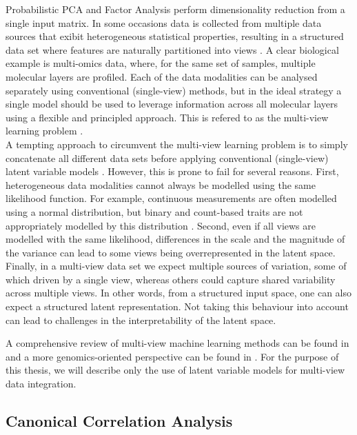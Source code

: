 Probabilistic PCA and Factor Analysis perform dimensionality reduction from a single input matrix. In some occasions data is collected from multiple data sources that exibit heterogeneous statistical properties, resulting in a structured data set where features are naturally partitioned into views \cite{Xu2013,Li2016,Zeng2018}. A clear biological example is multi-omics data, where, for the same set of samples, multiple molecular layers are profiled. Each of the data modalities can be analysed separately using conventional (single-view) methods, but in the ideal strategy a single model should be used to leverage information across all molecular layers using a flexible and principled approach. This is refered to as the multi-view learning problem \cite{Xu2013,Li2016}.\\
A tempting approach to circumvent the multi-view learning problem is to simply concatenate all different data sets before applying conventional (single-view) latent variable models \cite{Ritchie2015}. However, this is prone to fail for several reasons. First, heterogeneous data modalities cannot always be modelled using the same likelihood function. For example, continuous measurements are often modelled using a normal distribution, but binary and count-based traits are not appropriately modelled by this distribution \cite{Pilling2018}. Second, even if all views are modelled with the same likelihood, differences in the scale and the magnitude of the variance can lead to some views being overrepresented in the latent space. Finally, in a multi-view data set we expect multiple sources of variation, some of which driven by a single view, whereas others could capture shared variability across multiple views. In other words, from a structured input space, one can also expect a structured latent representation. Not taking this behaviour into account can lead to challenges in the interpretability of the latent space.

A comprehensive review of multi-view machine learning methods can be found in \cite{Xu2013} and a more genomics-oriented perspective can be found in \cite{Ritchie2015}. For the purpose of this thesis, we will describe only the use of latent variable models for multi-view data integration.

\subsection{Canonical Correlation Analysis} \label{cca}

